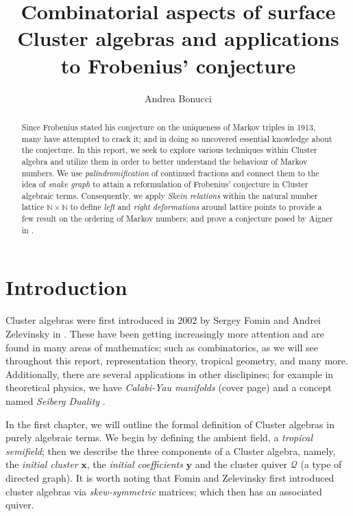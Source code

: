 \documentclass[12pt,vu]{adammath}
\title{Combinatorial aspects of surface Cluster algebras and applications to Frobenius' conjecture}
\author[a.bonucci@student.vu.nl, 2694276]{Andrea Bonucci}
\theoremstyle{theorem}
\theoremstyle{corollary}
\theoremstyle{conjecture}
\theoremstyle{proposition}
\theoremstyle{definition}
\theoremstyle{remark}
\begin{document}

\maketitle

\begin{abstract}
    Since Frobenius stated his conjecture on the uniqueness of Markov triples in 1913, many have attempted to crack it; and in doing so uncovered essential knowledge about the conjecture. In this report, we seek to explore various techniques within Cluster algebra and utilize them in order to better understand the behaviour of Markov numbers. We use \emph{palindromification} of continued fractions and connect them to the idea of \emph{snake graph} to attain a reformulation of Frobenius' conjecture in Cluster algebraic terms. Consequently, we apply \emph{Skein relations} within the natural number lattice $\mathbb{N}\times \mathbb{N}$ to define \emph{left} and \emph{right deformations} around lattice points to provide a few result on the ordering of Markov numbers; and prove a conjecture posed by Aigner in \cite{A}. 
\end{abstract}
\newpage 
\tableofcontents
\newpage
\chapter*{Introduction}
Cluster algebras were first introduced in 2002 by Sergey Fomin and Andrei Zelevinsky in \cite{FZ1}. These have been getting increasingly more attention and are found in many areas of mathematics; such as combinatorics, as we will see throughout this report, representation theory, tropical geometry, and many more. Additionally, there are several applications in other disclipines; for example in theoretical physics, we have \emph{Calabi-Yau manifolds}  (cover page) and a concept named \emph{Seiberg Duality} \cite{Bao}. 

In the first chapter, we will outline the formal definition of Cluster algebras in purely algebraic terms. We begin by defining the ambient field, a \emph{tropical semifield}; then we describe the three components of a Cluster algebra, namely, the \emph{initial cluster} $\mathbf{x}$, the \emph{initial coefficients} $\mathbf{y}$ and the cluster quiver $\mathcal{Q}$ (a type of directed graph). It is worth noting that Fomin and Zelevinsky first introduced cluster algebras via \emph{skew-symmetric} matrices; which then has an associated quiver. 
\end{document}
